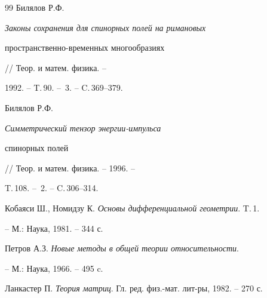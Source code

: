\begin{thebibliography}{99}
Билялов Р.Ф. {\em Законы сохранения для спинорных полей на римановых


пространственно-временных многообразиях} // Теор. и матем. физика. --


1992. -- T.\,90. -- \No\,3. -- C.\,369--379.




Билялов Р.Ф. {\em Симметрический тензор энергии-импульса


спинорных полей} // Теор. и матем. физика. -- 1996. --


T.\,108. -- \No\,2. -- C.\,306--314.




Кобаяси Ш., Номидзу К. {\em Основы дифференциальной геометрии}. T.\,1.


-- М.: Наука, 1981. -- 344 с. 




Петров А.З. {\em Новые методы в общей теории относительности}.


-- М.: Наука, 1966. -- 495 c.




Ланкастер П. {\em Теория матриц}. Гл. ред. физ.-мат. лит-ры, 1982. -- 270 с.





\end{thebibliography}





\vskip 2cm














\label{end}


